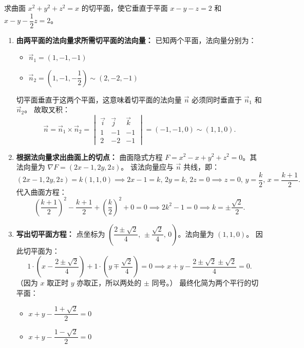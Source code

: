 \documentclass[lang=cn,11pt]{elegantbook}
\begin{document}
\begin{exercise}[曲面切平面与两平面的垂直关系]
求曲面 $x^2+y^2+z^2=x$ 的切平面，使它垂直于平面 $x-y-z=2$ 和 $x-y-\dfrac{1}{2}z=2$。
\end{exercise}
\begin{solution}
\begin{enumerate}
    \item \textbf{由两平面的法向量求所需切平面的法向量：}
    已知两个平面，法向量分别为：
    \begin{itemize}
        \item $\vec{n}_1 = (1, -1, -1)$
        \item $\vec{n}_2 = \left(1, -1, -\dfrac{1}{2}\right) \sim (2, -2, -1)$
    \end{itemize}
    切平面垂直于这两个平面，这意味着切平面的法向量 $\vec{n}$ 必须同时垂直于 $\vec{n}_1$ 和 $\vec{n}_2$。
    故取叉积：
    \[ \vec{n} = \vec{n}_1 \times \vec{n}_2 = \begin{vmatrix} \vec{i} & \vec{j} & \vec{k} \\ 1 & -1 & -1 \\ 2 & -2 & -1 \end{vmatrix} = (-1, -1, 0) \sim (1, 1, 0). \]

    \item \textbf{根据法向量求出曲面上的切点：}
    曲面隐式方程 $F = x^2-x+y^2+z^2 = 0$。其法向量为 $\nabla F = (2x-1, 2y, 2z)$。
    该法向量应与 $\vec{n}$ 共线，即：
    \[ (2x-1, 2y, 2z) = k(1, 1, 0) \implies 2x-1 = k,\, 2y = k,\, 2z = 0 \implies z=0,\, y=\frac{k}{2},\, x=\frac{k+1}{2}. \]
    代入曲面方程：
    \[ \left(\frac{k+1}{2}\right)^2 - \frac{k+1}{2} + \left(\frac{k}{2}\right)^2 + 0 = 0\implies 2k^2 - 1 = 0 \implies k = \pm\frac{\sqrt{2}}{2}. \]

    \item \textbf{写出切平面方程：}
    点坐标为 $\left( \dfrac{2\pm\sqrt{2}}{4},\, \pm\dfrac{\sqrt{2}}{4},\, 0 \right)$。法向量为 $(1, 1, 0)$。
    因此切平面为：
    \[ 1\cdot\left(x - \frac{2\pm\sqrt{2}}{4}\right) + 1\cdot\left(y \mp \frac{\sqrt{2}}{4}\right) = 0 \implies x+y - \frac{2\pm\sqrt{2}\pm\sqrt{2}}{4} = 0. \]
    （因为 $x$ 取正时 $y$ 亦取正，所以两处的 $\pm$ 同号。）
    最终化简为两个平行的切平面：
    \begin{itemize}
        \item $x+y - \dfrac{1+\sqrt{2}}{2} = 0$
        \item $x+y - \dfrac{1-\sqrt{2}}{2} = 0$
    \end{itemize}
\end{enumerate}
\end{solution}
\end{document}
